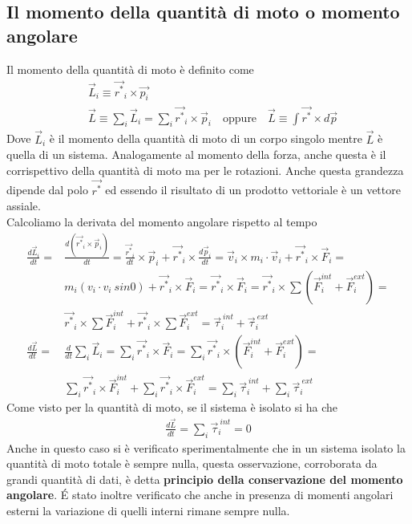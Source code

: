 \documentclass[10pt,a4paper]{article}
\begin{document}
\subsection{Il momento della quantità di moto o momento angolare}
Il momento della quantità di moto è definito come
\begin{align*}
	&\vec{L}_i \equiv \vec{r^*}_i \times \vec{p_i}\\
	&\vec{L} \equiv \sum_{i}\vec{L}_i = \sum_{i}\vec{r^*}_i \times \vec{p}_i \quad \text{oppure} \quad \vec{L} \equiv \int \vec{r^*} \times d\vec{p}
\end{align*}
Dove $\vec{L}_i$ è il momento della quantità di moto di un corpo singolo mentre $\vec{L}$ è quella di un sistema. Analogamente al momento della forza, anche questa è il corrispettivo della quantità di moto ma per le rotazioni. Anche questa grandezza dipende dal polo $\vec{r^*}$ ed essendo il risultato di un prodotto vettoriale è un vettore assiale.\\
Calcoliamo la derivata del momento angolare rispetto al tempo
\begin{align*}
	\frac{d\vec{L}_i}{dt} =& \frac{d(\vec{r^*}_i \times \vec{p}_i)}{dt}=  \frac{\vec{r^*}_i}{dt} \times \vec{p}_i + \vec{r^*}_i  \times \frac{d\vec{p}_i}{dt} = \vec{v}_i \times m_i\cdot\vec{v}_i + \vec{r^*}_i \times \vec{F}_i =\\
	& m_i(v_i\cdot v_i\ sin0) + \vec{r^*}_i \times \vec{F}_i= \vec{r^*}_i \times \vec{F}_i = \vec{r^*}_i \times \sum (\vec{F}^{int}_i +\vec{F}^{ext}_i)=\\ &\vec{r^*}_i \times \sum \vec{F}^{int}_i+\vec{r^*}_i \times \sum \vec{F}^{ext}_i = \vec{\tau}_i^{\ int}+\vec{\tau}_i^{\ ext} \\
	\frac{d\vec{L}}{dt} = & \frac{d }{dt}\sum_{i}\vec{L}_i =\sum_{i} \vec{r^*}_i \times \vec{F}_i=\sum_{i} \vec{r^*}_i \times (\vec{F}^{int}_i+\vec{F}^{ext}_i)=\\ 
	&\sum_{i} \vec{r^*}_i \times \vec{F}^{int}_i+\sum_{i} \vec{r^*}_i \times \vec{F}^{ext}_i=\sum_{i}\vec{\tau}_i^{\ int} + \sum_{i}\vec{\tau}_i^{\ ext}
\end{align*}
Come visto per la quantità di moto, se il sistema è isolato si ha che 
\begin{align*}
		\frac{d\vec{L}}{dt} =\sum_{i}\vec{\tau}_i^{\ int}=0
\end{align*}
Anche in questo caso si è verificato sperimentalmente che in un sistema isolato la quantità di moto totale è sempre nulla, questa osservazione, corroborata da grandi quantità di dati, è detta \textbf{principio della conservazione del momento angolare}. \'{E} stato inoltre verificato che anche in presenza di momenti angolari esterni la variazione di quelli interni rimane sempre nulla.\\
\end{document}
